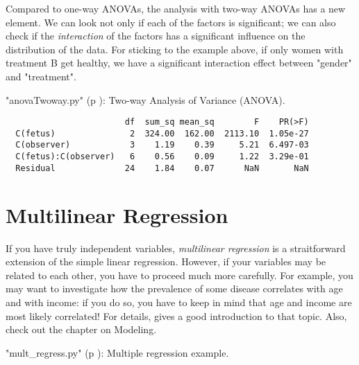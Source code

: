 Compared to one-way ANOVAs, the analysis with two-way ANOVAs has a new element. We can look not only if each of the factors is significant; we can also check if the \emph{interaction} of the factors has a significant influence on the distribution of the data. For sticking to the example above, if only women with treatment B get healthy, we have a significant interaction effect between "gender" and "treatment".

\PyImg "anovaTwoway.py" (p \pageref{py:anovaTwoway}): Two-way Analysis of Variance (ANOVA).

\begin{verbatim}
                        df  sum_sq mean_sq        F    PR(>F)
  C(fetus)               2  324.00  162.00  2113.10  1.05e-27
  C(observer)            3    1.19    0.39     5.21  6.497-03
  C(fetus):C(observer)   6    0.56    0.09     1.22  3.29e-01
  Residual              24    1.84    0.07      NaN       NaN
\end{verbatim}

\section{Multilinear Regression} 

If you have truly independent variables, \emph{multilinear regression} is a straitforward extension of the simple linear regression. However, if your variables may be related to each other, you have to proceed much more carefully. For example, you may want to investigate how the prevalence of some disease correlates with age and with income: if you do so, you have to keep in mind that age and income are most likely correlated! For details, \cite{Kaplan2009} gives a good introduction to that topic. Also, check out the chapter on Modeling.

\PyImg "mult\_regress.py" (p \pageref{py:mult_regress}): Multiple regression example.
